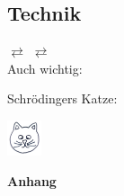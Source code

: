 \documentclass[fs, footer]{latex4ei}
\begin{document}
\begin{multicols*}{4}
{}


\section{Technik}
 $\rightleftarrows$  $\rightleftarrows$ \\

\vspace{0.5cm}
Auch wichtig:

Schrödingers Katze: \parbox{1cm}{ \includegraphics[width=1cm]{img/cat.jpg}}

\newpage

{\Huge \bf Anhang}


\end{multicols*}
\end{document}
